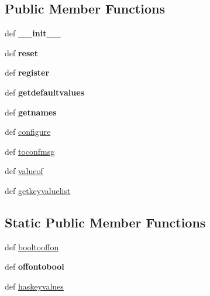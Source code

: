 \subsection*{Public Member Functions}
\begin{DoxyCompactItemize}
\item 
\hypertarget{classcore_1_1conf_1_1_configurable_a9d5991a67c2f95656de69e3ec756f01c}{def {\bfseries \+\_\+\+\_\+init\+\_\+\+\_\+}}\label{classcore_1_1conf_1_1_configurable_a9d5991a67c2f95656de69e3ec756f01c}

\item 
\hypertarget{classcore_1_1conf_1_1_configurable_a87e5a197d1ecbd32e01eda6ea08b63ff}{def {\bfseries reset}}\label{classcore_1_1conf_1_1_configurable_a87e5a197d1ecbd32e01eda6ea08b63ff}

\item 
\hypertarget{classcore_1_1conf_1_1_configurable_af8aad484388013bb4b10494bdcbb9c33}{def {\bfseries register}}\label{classcore_1_1conf_1_1_configurable_af8aad484388013bb4b10494bdcbb9c33}

\item 
\hypertarget{classcore_1_1conf_1_1_configurable_aea0ce068624a2f390467745aff1f99d8}{def {\bfseries getdefaultvalues}}\label{classcore_1_1conf_1_1_configurable_aea0ce068624a2f390467745aff1f99d8}

\item 
\hypertarget{classcore_1_1conf_1_1_configurable_a79f79b7785137cec6e99145f07ef008c}{def {\bfseries getnames}}\label{classcore_1_1conf_1_1_configurable_a79f79b7785137cec6e99145f07ef008c}

\item 
def \hyperlink{classcore_1_1conf_1_1_configurable_a0a885b70df1d014ac5cab828020674a0}{configure}
\item 
def \hyperlink{classcore_1_1conf_1_1_configurable_afdbc51e7c337585f2533db75d5303154}{toconfmsg}
\item 
def \hyperlink{classcore_1_1conf_1_1_configurable_aeb6dbf836fb34cc0e220562a3794b7d4}{valueof}
\item 
def \hyperlink{classcore_1_1conf_1_1_configurable_a25d268d6010de8bed0795232bc51683b}{getkeyvaluelist}
\end{DoxyCompactItemize}
\subsection*{Static Public Member Functions}
\begin{DoxyCompactItemize}
\item 
def \hyperlink{classcore_1_1conf_1_1_configurable_acd09efca73c9b01512179f71a72d11a5}{booltooffon}
\item 
\hypertarget{classcore_1_1conf_1_1_configurable_a10620ed49eb196cfe332c12068ee3014}{def {\bfseries offontobool}}\label{classcore_1_1conf_1_1_configurable_a10620ed49eb196cfe332c12068ee3014}

\item 
def \hyperlink{classcore_1_1conf_1_1_configurable_a6c62bb4c659d5c9e89bc4236778aedf9}{haskeyvalues}
\end{DoxyCompactItemize}
